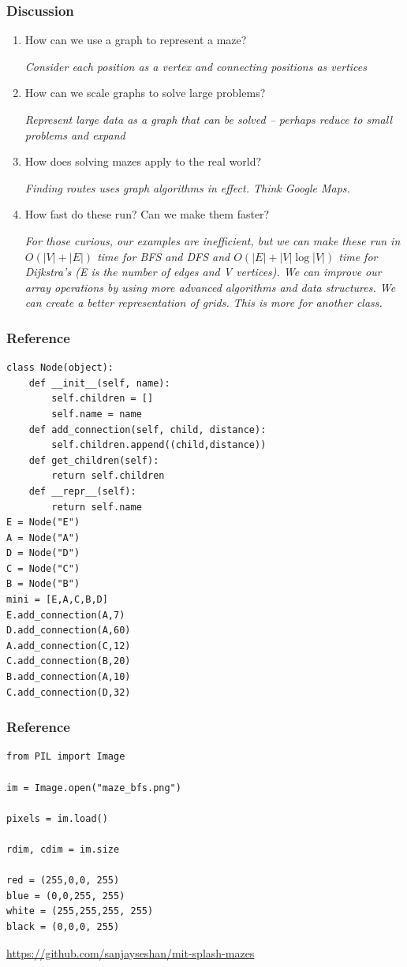 \documentclass{beamer}
\begin{document}
\begin{frame}
    \frametitle{Discussion}

    \begin{enumerate}[(1)]
        \item How can we use a graph to represent a maze?
        
        \textit{Consider each position as a vertex and connecting positions as vertices}
        \item How can we scale graphs to solve large problems?
        
        \textit{Represent large data as a graph that can be solved -- perhaps reduce to small problems and expand}

        \item How does solving mazes apply to the real world?

        \textit{Finding routes uses graph algorithms in effect. Think Google Maps.}

        \item How fast do these run? Can we make them faster?

        \textit{For those curious, our examples are inefficient, but we can make these run in $O(|V|+|E|)$ time for BFS and DFS and $O(|E| + |V|\log |V|)$ time for Dijkstra's (E is the number of edges and V vertices). We can improve our array operations by using more advanced algorithms and data structures. We can create a better representation of grids. This is more for another class.}

    \end{enumerate}

\end{frame}

\begin{frame}[fragile]
    \frametitle{Reference}

\begin{lstlisting}
class Node(object):
    def __init__(self, name):
        self.children = []
        self.name = name
    def add_connection(self, child, distance):
        self.children.append((child,distance))
    def get_children(self):
        return self.children
    def __repr__(self):
        return self.name
E = Node("E")
A = Node("A")
D = Node("D")
C = Node("C")
B = Node("B")
mini = [E,A,C,B,D]
E.add_connection(A,7)
D.add_connection(A,60)
A.add_connection(C,12)
C.add_connection(B,20)
B.add_connection(A,10)
C.add_connection(D,32)
    \end{lstlisting}
\end{frame}
    \begin{frame}[fragile]
        \frametitle{Reference}
    
    \begin{lstlisting}
from PIL import Image

im = Image.open("maze_bfs.png")

pixels = im.load()

rdim, cdim = im.size

red = (255,0,0, 255)
blue = (0,0,255, 255)
white = (255,255,255, 255)
black = (0,0,0, 255)
    \end{lstlisting}
    
    \url{https://github.com/sanjayseshan/mit-splash-mazes}
\end{frame}
\end{document}
